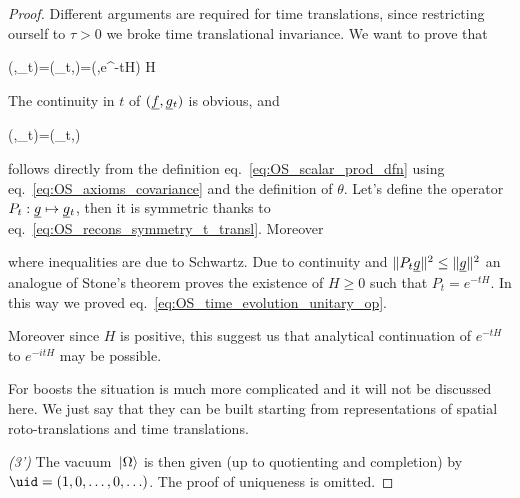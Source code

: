 \documentclass[../main/main.tex]{subfiles}
\begin{document}
\begin{proof}
	Different arguments are required for time translations, since restricting ourself to $\tau>0$ we broke time translational invariance. We want to prove that 
	\begin{eq}\label{eq:OS_time_evolution_unitary_op}
		(\uf,\ug_t)=(\uf_t,\ug)=(\uf,{e^{-tH}\ug})
		\twith 
		H 
	\end{eq}
	The continuity in $t$ of $(\uf,\ug_t)$ is obvious, and 
	\begin{eq}\label{eq:OS_recons_symmetry_t_transl}
		(\uf,\ug_t)=(\uf_t,\ug)
	\end{eq}
	follows directly from the definition eq.~\eqref{eq:OS_scalar_prod_dfn} using eq.~\eqref{eq:OS_axioms_covariance} and the definition of $\theta$. 
	Let's define the operator $P_t:\ug\mapsto\ug_t$, then it is symmetric thanks to eq.~\eqref{eq:OS_recons_symmetry_t_transl}. Moreover 
	\begin{eq}\end{eq}
	where inequalities are due to Schwartz. Due to continuity and $\norm{P_t\ug}^2\leq\norm\ug^2$ an analogue of Stone's theorem proves the existence of $H\geq0$ such that $P_t=e^{-tH}$. In this way we proved eq.~\eqref{eq:OS_time_evolution_unitary_op}.
	
	Moreover since $H$ is positive, this suggest us that analytical continuation of $e^{-tH}$ to $e^{-itH}$ may be possible.
	
	For boosts the situation is much more complicated and it will not be discussed here. We just say that they can be built starting from representations of spatial roto-translations and time translations.
	
	\textit{(3')} The vacuum $\,\vert\Omega\rangle$ is then given (up to quotienting and completion) by $\uid=(1,0,\ldots,0,\ldots)$. The proof of uniqueness is omitted.
	

\end{proof}
\end{document}
